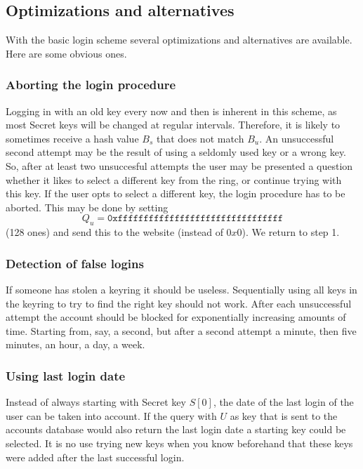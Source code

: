\subsection{Optimizations and alternatives}
With the basic login scheme several optimizations and alternatives are available.
Here are some obvious ones.
\subsubsection{Aborting the login procedure}
Logging in with an old key every now and then is inherent in this scheme,
as most Secret keys will be changed at regular intervals.
Therefore,
it is likely to sometimes receive a hash value $B_s$ that does not match $B_u$.
An unsuccessful second attempt may be the result of using a seldomly used key or a wrong key.
So, after at least two unsuccesful attempts
the user may be presented a question whether it likes to select a different key from the ring,
or continue trying with this key.
If the user opts to select a different key, the login procedure has to be aborted.
This may be done by setting
\[Q_u=\mathtt{0xffffffffffffffffffffffffffffffff}\]
(128 ones) and send this to the website
(instead of $0x0$).
We return to step 1.

\subsubsection{Detection of false logins}
If someone has stolen a keyring it should be useless.
Sequentially using all keys in the keyring to try to find the right key should not work.
After each unsuccessful attempt the account should be blocked for exponentially increasing amounts of time.
Starting from, say, a second, but after a second attempt a minute, then five minutes, an hour, a day, a week.

\subsubsection{Using last login date}
Instead of always starting with Secret key $S[0]$,
the date of the last login of the user can be taken into account.
If the query with $U$ as key that is sent to the accounts database would also return the last login date a starting key could be selected.
It is no use trying new keys when you know beforehand that these keys were added after the last successful login.


